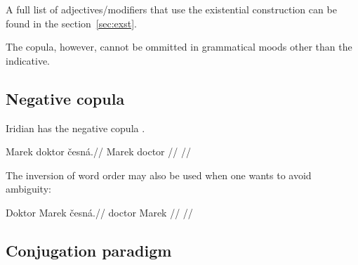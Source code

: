 A full list of adjectives/modifiers that use the existential construction can be found in the section~\ref{sec:exst}.

The copula, however, cannot be ommitted in grammatical moods other than the indicative.

\subsection{Negative copula}

Iridian has the negative copula .

\pex
\begingl
\gla Marek doktor česná.//
\glb Marek doctor //
\glft {}//
\endgl
\xe

\par The inversion of word order may also be used when one wants to avoid ambiguity:

\pex
\begingl
\gla Doktor Marek česná.//
\glb doctor Marek //
\glft {}//
\endgl
\xe


\subsection{Conjugation paradigm}
